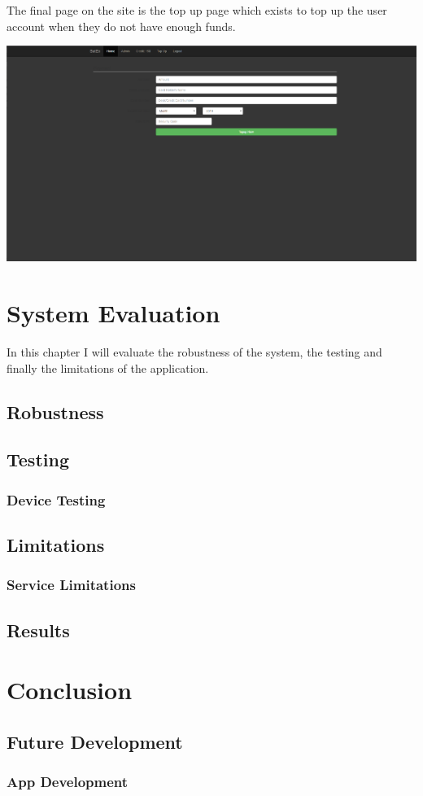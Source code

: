 The final page on the site is the top up page which exists to top up the user account when they do not have enough funds.

\includegraphics[width=\textwidth,height=\textheight,keepaspectratio]{img/screenshots/topup.png}

\chapter{System Evaluation}
In this chapter I will evaluate the robustness of the system, the testing and finally the limitations of the application.

\section{Robustness}

\section{Testing}
\subsection{Device Testing}

\section{Limitations}
\subsection{Service Limitations}

\section{Results}

\chapter{Conclusion}
\section{Future Development}
\subsection{App Development}

